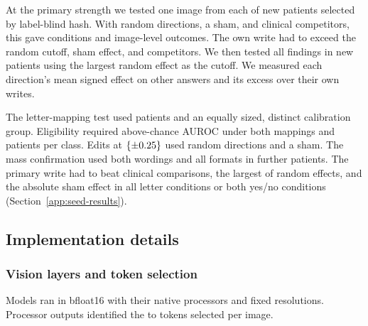 At the primary strength we tested one image from each of \jnReplicationEffusionRows{} new patients selected by label-blind hash. With \jnLabelControlCount{} random directions, a sham, and clinical competitors, this gave \jnReplicationConfigurations{} conditions and \jnReplicationOutcomeCount{} image-level outcomes. The own write had to exceed the random cutoff, sham effect, and competitors. We then tested all findings in \jnReplicationMatrixRows{} new patients using the largest random effect as the cutoff. We measured each direction's mean signed effect on other answers and its excess over their own writes.

The letter-mapping test used \jnReplicationPromptRows{} patients and an equally sized, distinct calibration group. Eligibility required above-chance AUROC under both mappings and \jnMinClassSupport{} patients per class. Edits at $\{\pm0.25\}$ used \jnLabelControlCount{} random directions and a sham. The mass confirmation used both wordings and all formats in \jnReplicationMassRows{} further patients. The primary write had to beat \jnLabelControlCount{} clinical comparisons, the largest of \jnRandomDirections{} random effects, and the absolute sham effect in all letter conditions or both yes/no conditions (Section~\ref{app:seed-results}).

\subsection{Implementation details}
\label{sec:implementation}

\subsubsection{Vision layers and token selection}
\label{app:repro-sites}
\label{app:repro-mask}

Models ran in bfloat16 with their native processors and fixed resolutions. Processor outputs identified the \cfTokensMin{} to \cfTokensMax{} tokens selected per image.

